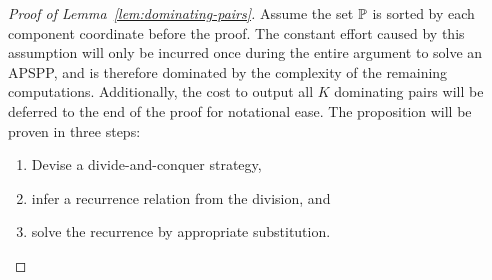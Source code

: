 \begin{proof}[Proof of Lemma~\ref{lem:dominating-pairs}]
    Assume the set $\mathbb{P}$ is sorted by each component coordinate before the proof.
    The constant effort caused by this assumption will only be incurred once during the entire argument to solve an APSPP, and is therefore dominated by the complexity of the remaining computations.
    Additionally, the cost to output all $K$ dominating pairs will be deferred to the end of the proof for notational ease.
    The proposition will be proven in three steps:
    \begin{enumerate}
        \item Devise a divide-and-conquer strategy,
        \item infer a recurrence relation from the division, and
        \item solve the recurrence by appropriate substitution.
    \end{enumerate}


\end{proof}
